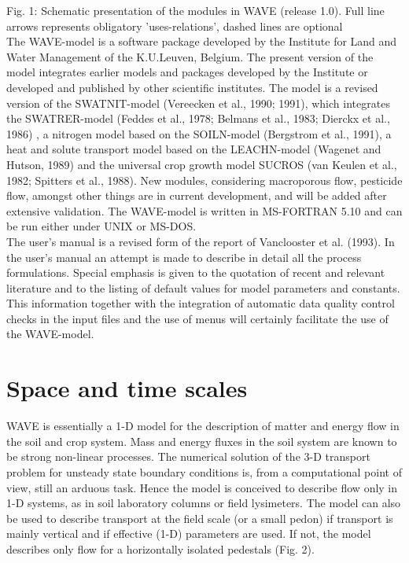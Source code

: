 Fig. 1: Schematic presentation of the modules in WAVE (release 1.0). Full line arrows represents obligatory 'uses-relations', dashed lines are optional\\

The WAVE-model is a software package developed by the Institute for Land and Water Management of the K.U.Leuven, Belgium. The present version of the model integrates earlier models and packages developed by the Institute or developed and published by other scientific institutes. The model is a revised version of the SWATNIT-model (Vereecken et al., 1990; 1991), which integrates the SWATRER-model (Feddes et al., 1978; Belmans et al., 1983; Dierckx et al., 1986) , a nitrogen model based on the SOILN-model (Bergstrom et al., 1991), a heat and solute transport model based on the LEACHN-model (Wagenet and Hutson, 1989) and the universal crop growth model SUCROS (van Keulen et al., 1982; Spitters et al., 1988). New modules, considering macroporous flow, pesticide flow, amongst other things are in current development, and will be added after extensive validation. The WAVE-model is written in MS-FORTRAN 5.10 and can be run either under UNIX or MS-DOS.\\

The user's manual is a revised form of the report of Vanclooster et al. (1993). In the user's manual an attempt is made to describe in detail all the process formulations. Special emphasis is given to the quotation of recent and relevant literature and to the listing of default values for model parameters and constants. This information together with the integration of automatic data quality control checks in the input files and the use of menus will certainly facilitate the use of the WAVE-model.\\

\section{Space and time scales}

WAVE is essentially a 1-D model for the description of matter and energy flow in the soil and crop system. Mass and energy fluxes in the soil system are known to be strong non-linear processes. The numerical solution of the 3-D transport problem for unsteady state boundary conditions is, from a computational point of view, still an arduous task. Hence the model is conceived to describe flow only in 1-D systems, as in soil laboratory columns or field lysimeters. The model can also be used to describe transport at the field scale (or a small pedon) if transport is mainly vertical and if effective (1-D) parameters are used. If not, the model describes only flow for a horizontally isolated pedestals (Fig. 2).\\


